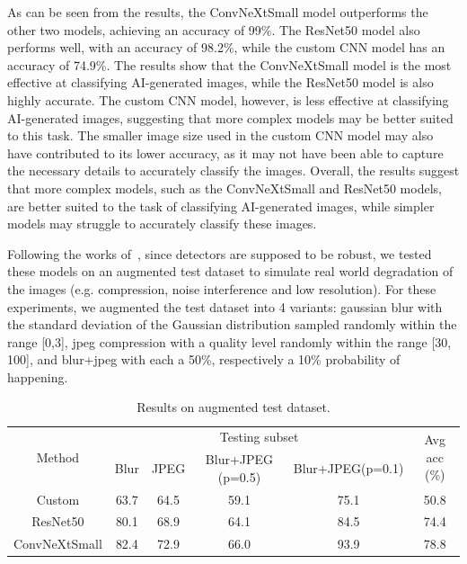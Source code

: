 \documentclass[runningheads]{llncs}
\begin{document}
As can be seen from the results, the ConvNeXtSmall model outperforms the other two models, achieving an accuracy of 99\%. The ResNet50 model also performs well, with an accuracy of 98.2\%, while the custom CNN model has an accuracy of 74.9\%. The results show that the ConvNeXtSmall model is the most effective at classifying AI-generated images, while the ResNet50 model is also highly accurate. The custom CNN model, however, is less effective at classifying AI-generated images, suggesting that more complex models may be better suited to this task. The smaller image size used in the custom CNN model may also have contributed to its lower accuracy, as it may not have been able to capture the necessary details to accurately classify the images. Overall, the results suggest that more complex models, such as the ConvNeXtSmall and ResNet50 models, are better suited to the task of classifying AI-generated images, while simpler models may struggle to accurately classify these images.


Following the works of~\cite{wang2019cnngenerated}, since detectors are supposed to be robust, we tested these models on an augmented test dataset to simulate real world degradation of the images (e.g. compression, noise interference and low resolution). For these experiments, we augmented the test dataset into 4 variants: gaussian blur with the standard deviation of the Gaussian distribution sampled randomly within the range [0,3], jpeg compression with a quality level randomly within the range [30, 100], and blur+jpeg with each a 50\%, respectively a 10\% probability of happening.

\begin{table}[h]
    \centering
    \caption{Results on augmented test dataset.}
    \begin{tabular}{c|c|c|c|c|c}
    \hline
    \multirow{2}{*}{Method} & \multicolumn{4}{c|}{Testing subset} & \multirow{2}{*}{Avg acc (\%)} \\ \cline{2-5}
                                      & Blur & JPEG & Blur+JPEG (p=0.5) & Blur+JPEG(p=0.1) & \\ \hline
    Custom                            & 63.7   & 64.5   & 59.1   & 75.1   & 50.8 \\ \hline
    ResNet50                          & 80.1   & 68.9   & 64.1   & 84.5   & 74.4 \\ \hline
    ConvNeXtSmall                     & 82.4   & 72.9   & 66.0   & 93.9   & 78.8 \\ \hline
    \end{tabular}
    \label{tab:augmentedresults}
\end{table}
\end{document}
